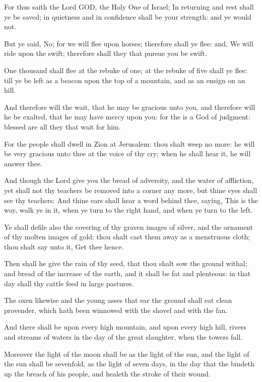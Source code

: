\Verse For thus saith the Lord GOD, the Holy One of Israel; In returning and rest shall ye be saved; in quietness and in confidence shall be your strength: and ye would not.

\Verse But ye said, No; for we will flee upon horses; therefore shall ye flee: and, We will ride upon the swift; therefore shall they that pursue you be swift.

\Verse One thousand shall flee at the rebuke of one; at the rebuke of five shall ye flee: till ye be left as a beacon upon the top of a mountain, and as an ensign on an hill.

\Verse And therefore will the \LORD wait, that he may be gracious unto you, and therefore will he be exalted, that he may have mercy upon you: for the \LORD is a God of judgment: blessed are all they that wait for him.

\Verse For the people shall dwell in Zion at Jerusalem: thou shalt weep no more: he will be very gracious unto thee at the voice of thy cry; when he shall hear it, he will answer thee.

\Verse And though the Lord give you the bread of adversity, and the water of affliction, yet shall not thy teachers be removed into a corner any more, but thine eyes shall see thy teachers: \Verse And thine ears shall hear a word behind thee, saying, This is the way, walk ye in it, when ye turn to the right hand, and when ye turn to the left.

\Verse Ye shall defile also the covering of thy graven images of silver, and the ornament of thy molten images of gold: thou shalt cast them away as a menstruous cloth; thou shalt say unto it, Get thee hence.

\Verse Then shall he give the rain of thy seed, that thou shalt sow the ground withal; and bread of the increase of the earth, and it shall be fat and plenteous: in that day shall thy cattle feed in large pastures.

\Verse The oxen likewise and the young asses that ear the ground shall eat clean provender, which hath been winnowed with the shovel and with the fan.

\Verse And there shall be upon every high mountain, and upon every high hill, rivers and streams of waters in the day of the great slaughter, when the towers fall.

\Verse Moreover the light of the moon shall be as the light of the sun, and the light of the sun shall be sevenfold, as the light of seven days, in the day that the \LORD bindeth up the breach of his people, and healeth the stroke of their wound.

